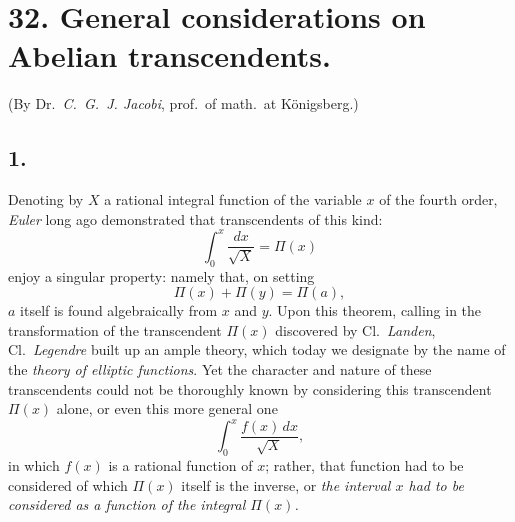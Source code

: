 \documentclass{article}
\begin{document}
\section*{32. General considerations on Abelian transcendents.}

(By Dr.\ \emph{C.~G.~J. Jacobi}, prof.\ of math.\ at Königsberg.)

\subsection*{1.}

Denoting by $X$ a rational integral function of the variable $x$ of the fourth order, \emph{Euler} long ago demonstrated that transcendents of this kind:
\[ \int_0^{x} \frac{dx}{\sqrt{X}} = \Pi(x) \]
enjoy a singular property: namely that, on setting
\[ \Pi(x) + \Pi(y) = \Pi(a), \]
$a$ itself is found algebraically from $x$ and $y$. Upon this theorem, calling in the transformation of the transcendent $\Pi(x)$ discovered by Cl.\ \emph{Landen}, Cl.\ \emph{Legendre} built up an ample theory, which today we designate by the name of the \emph{theory of elliptic functions}. Yet the character and nature of these transcendents could not be thoroughly known by considering this transcendent $\Pi(x)$ alone, or even this more general one
\[ \int_0^{x} \frac{f(x)\,dx}{\sqrt{X}}, \]
in which $f(x)$ is a rational function of $x$; rather, that function had to be considered of which $\Pi(x)$ itself is the inverse, or \emph{the interval $x$ had to be considered as a function of the integral $\Pi(x)$.}
\end{document}
